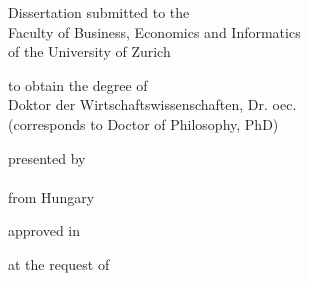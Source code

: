 \makeatletter
    \let\inserttitle\@title
    \let\insertauthor\@author
    \let\insertdate\@date
    \let\insertchairman\@chairman
    \let\insertcommittee\@committee
\makeatother

\begin{titlepage}
    \begin{doublespace}
    \begin{center}
        \vspace*{3cm}

        \begin{LARGE}
            \textbf{\inserttitle}
        \end{LARGE}

        \vfill

        \begin{large}
            Dissertation submitted to the\\Faculty of Business, Economics and Informatics\\of the University of Zurich
        \end{large}
 
        \vfill

        \begin{large}
            to obtain the degree of\\
            Doktor der Wirtschaftswissenschaften, Dr. oec.\\
            (corresponds to Doctor of Philosophy, PhD)
        \end{large}

        \vfill

        \begin{large}
            presented by\\
            \textbf{\insertauthor}\\
            from Hungary
        \end{large}

        \vfill

        \begin{large}
            approved in \monthyeardate\insertdate
        \end{large}

        \vfill

        \begin{large}
            at the request of\\\insertcommittee
        \end{large}

    \vspace*{1cm}

    \end{center}
    \end{doublespace}
\end{titlepage}